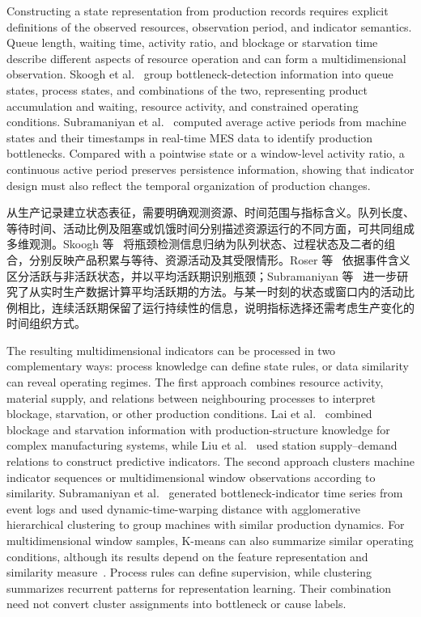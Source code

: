 \documentclass[a4paper,fleqn]{cas-dc}
\newcommand{\zhpara}[1]{%
  \par\begingroup\small\color{black!72}\noindent #1\par\endgroup}
\begin{document}
Constructing a state representation from production records requires explicit definitions of the observed resources, observation period, and indicator semantics. Queue length, waiting time, activity ratio, and blockage or starvation time describe different aspects of resource operation and can form a multidimensional observation. Skoogh et al.~\cite{subramaniyan2023throughput} group bottleneck-detection information into queue states, process states, and combinations of the two, representing product accumulation and waiting, resource activity, and constrained operating conditions. Subramaniyan et al.~\cite{subramaniyan2016realtime} computed average active periods from machine states and their timestamps in real-time MES data to identify production bottlenecks. Compared with a pointwise state or a window-level activity ratio, a continuous active period preserves persistence information, showing that indicator design must also reflect the temporal organization of production changes.

\zhpara{从生产记录建立状态表征，需要明确观测资源、时间范围与指标含义。队列长度、等待时间、活动比例及阻塞或饥饿时间分别描述资源运行的不同方面，可共同组成多维观测。Skoogh 等~\cite{subramaniyan2023throughput} 将瓶颈检测信息归纳为队列状态、过程状态及二者的组合，分别反映产品积累与等待、资源活动及其受限情形。Roser 等~\cite{roser2001practical} 依据事件含义区分活跃与非活跃状态，并以平均活跃期识别瓶颈；Subramaniyan 等~\cite{subramaniyan2016realtime} 进一步研究了从实时生产数据计算平均活跃期的方法。与某一时刻的状态或窗口内的活动比例相比，连续活跃期保留了运行持续性的信息，说明指标选择还需考虑生产变化的时间组织方式。}


The resulting multidimensional indicators can be processed in two complementary ways: process knowledge can define state rules, or data similarity can reveal operating regimes. The first approach combines resource activity, material supply, and relations between neighbouring processes to interpret blockage, starvation, or other production conditions. Lai et al.~\cite{lai2021data} combined blockage and starvation information with production-structure knowledge for complex manufacturing systems, while Liu et al.~\cite{liu2023lstmdam} used station supply--demand relations to construct predictive indicators. The second approach clusters machine indicator sequences or multidimensional window observations according to similarity. Subramaniyan et al.~\cite{subramaniyan2020clustering} generated bottleneck-indicator time series from event logs and used dynamic-time-warping distance with agglomerative hierarchical clustering to group machines with similar production dynamics. For multidimensional window samples, K-means can also summarize similar operating conditions, although its results depend on the feature representation and similarity measure~\cite{jain2010clustering}. Process rules can define supervision, while clustering summarizes recurrent patterns for representation learning. Their combination need not convert cluster assignments into bottleneck or cause labels.
\end{document}
